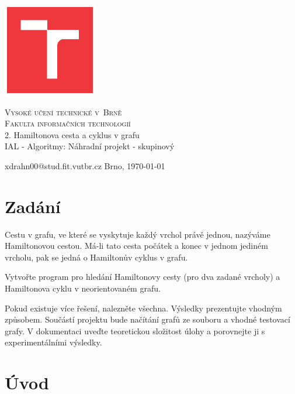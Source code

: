\documentclass[a4paper,11pt]{article}
\begin{document}
\begin{titlepage}

	\begin{center}

        \includegraphics[width=4.1cm,keepaspectratio,trim={1.2cm 1.2cm 1.2cm 1.2cm},clip]{template-fig/VUT_symbol_barevne_CMYK_CZ}%

		{\Huge\textsc{Vysoké učení technické v~Brně}}\\
		\medskip
		{\huge\textsc{Fakulta informačních technologií}}\\
		{\huge 2. Hamiltonova cesta a cyklus v grafu}\\
		\medskip
		{\LARGE IAL - Algoritmy: Náhradní projekt - skupinový}\\
	\end{center}

    \noindent xdrahn00@stud.fit.vutbr.cz \Large {\hfill Brno, \today}

\end{titlepage}

\section{Zadání}

Cestu v grafu, ve které se vyskytuje každý vrchol právě jednou, nazýváme Hamiltonovou cestou. Má-li tato cesta počátek a konec v jednom jediném vrcholu, pak se jedná o Hamiltonův cyklus v grafu. 

Vytvořte program pro hledání Hamiltonovy cesty (pro dva zadané vrcholy) a Hamiltonova cyklu v neorientovaném grafu. 

Pokud existuje více řešení, nalezněte všechna. Výsledky prezentujte vhodným způsobem. Součástí projektu bude načítání grafů ze souboru a vhodné testovací grafy. V dokumentaci uveďte teoretickou složitost úlohy a porovnejte ji s experimentálními výsledky.

\section{Úvod}
\end{document}
